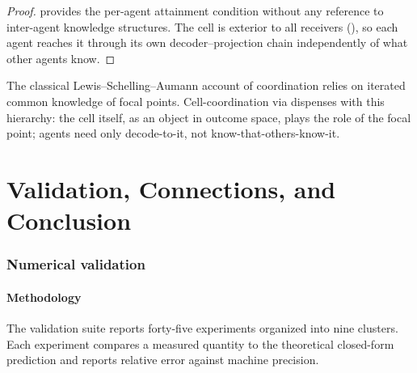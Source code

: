 \documentclass[11pt,a4paper]{article}
\begin{document}
\begin{proof}
 provides the per-agent attainment condition without any
reference to inter-agent knowledge structures. The cell is exterior
to all receivers (), so each agent reaches it
through its own decoder--projection chain independently of what other
agents know.
\end{proof}

\begin{remark}
\label{rem:ck-disposal}
The classical Lewis--Schelling--Aumann account of coordination relies
on iterated common knowledge of focal points. Cell-coordination via
 dispenses with this hierarchy: the cell itself, as an
object in outcome space, plays the role of the focal point; agents
need only decode-to-it, not know-that-others-know-it.
\end{remark}

\part{Validation, Connections, and Conclusion}

\section{Numerical validation}
\label{sec:validation}

\subsection{Methodology}

The validation suite reports forty-five experiments organized into
nine clusters. Each experiment compares a measured quantity to the
theoretical closed-form prediction and reports relative error against
machine precision.
\end{document}
